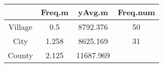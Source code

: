 \documentclass[]{book}
\theoremstyle{definition}
\theoremstyle{definition}
\theoremstyle{definition}
\theoremstyle{remark}
\begin{document}
\begin{longtable}[]{@{}cccc@{}}
\toprule
\begin{minipage}[b]{0.12\columnwidth}\centering\strut
~\strut
\end{minipage} & \begin{minipage}[b]{0.11\columnwidth}\centering\strut
Freq.m\strut
\end{minipage} & \begin{minipage}[b]{0.15\columnwidth}\centering\strut
yAvg.m\strut
\end{minipage} & \begin{minipage}[b]{0.15\columnwidth}\centering\strut
Freq.num\strut
\end{minipage}\tabularnewline
\midrule
\endhead
\begin{minipage}[t]{0.12\columnwidth}\centering\strut
Village\strut
\end{minipage} & \begin{minipage}[t]{0.11\columnwidth}\centering\strut
0.5\strut
\end{minipage} & \begin{minipage}[t]{0.15\columnwidth}\centering\strut
8792.376\strut
\end{minipage} & \begin{minipage}[t]{0.15\columnwidth}\centering\strut
50\strut
\end{minipage}\tabularnewline
\begin{minipage}[t]{0.12\columnwidth}\centering\strut
City\strut
\end{minipage} & \begin{minipage}[t]{0.11\columnwidth}\centering\strut
1.258\strut
\end{minipage} & \begin{minipage}[t]{0.15\columnwidth}\centering\strut
8625.169\strut
\end{minipage} & \begin{minipage}[t]{0.15\columnwidth}\centering\strut
31\strut
\end{minipage}\tabularnewline
\begin{minipage}[t]{0.12\columnwidth}\centering\strut
County\strut
\end{minipage} & \begin{minipage}[t]{0.11\columnwidth}\centering\strut
2.125\strut
\end{minipage} & \begin{minipage}[t]{0.15\columnwidth}\centering\strut
11687.969\strut
\end{minipage} & \begin{minipage}[t]{0.15\columnwidth}\centering\strut

\end{minipage}
\end{longtable}
\end{document}
